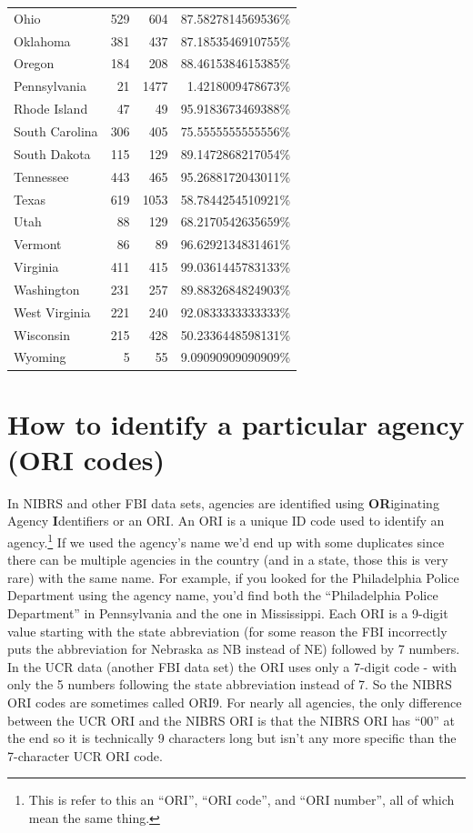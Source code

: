 \documentclass[
  12pt,
  openany]{book}
\begin{document}
\begin{longtable}[]{@{}lrrr@{}}
Ohio & 529 & 604 & 87.5827814569536\%\tabularnewline
Oklahoma & 381 & 437 & 87.1853546910755\%\tabularnewline
Oregon & 184 & 208 & 88.4615384615385\%\tabularnewline
Pennsylvania & 21 & 1477 & 1.4218009478673\%\tabularnewline
Rhode Island & 47 & 49 & 95.9183673469388\%\tabularnewline
South Carolina & 306 & 405 & 75.5555555555556\%\tabularnewline
South Dakota & 115 & 129 & 89.1472868217054\%\tabularnewline
Tennessee & 443 & 465 & 95.2688172043011\%\tabularnewline
Texas & 619 & 1053 & 58.7844254510921\%\tabularnewline
Utah & 88 & 129 & 68.2170542635659\%\tabularnewline
Vermont & 86 & 89 & 96.6292134831461\%\tabularnewline
Virginia & 411 & 415 & 99.0361445783133\%\tabularnewline
Washington & 231 & 257 & 89.8832684824903\%\tabularnewline
West Virginia & 221 & 240 & 92.0833333333333\%\tabularnewline
Wisconsin & 215 & 428 & 50.2336448598131\%\tabularnewline
Wyoming & 5 & 55 & 9.09090909090909\%\tabularnewline
\bottomrule
\end{longtable}

\hypertarget{ori}{%
\section{How to identify a particular agency (ORI codes)}\label{ori}}

In NIBRS and other FBI data sets, agencies are identified using \textbf{OR}iginating Agency \textbf{I}dentifiers or an ORI. An ORI is a unique ID code used to identify an agency.\footnote{This is refer to this an ``ORI'', ``ORI code'', and ``ORI number'', all of which mean the same thing.} If we used the agency's name we'd end up with some duplicates since there can be multiple agencies in the country (and in a state, those this is very rare) with the same name. For example, if you looked for the Philadelphia Police Department using the agency name, you'd find both the ``Philadelphia Police Department'' in Pennsylvania and the one in Mississippi. Each ORI is a 9-digit value starting with the state abbreviation (for some reason the FBI incorrectly puts the abbreviation for Nebraska as NB instead of NE) followed by 7 numbers. In the UCR data (another FBI data set) the ORI uses only a 7-digit code - with only the 5 numbers following the state abbreviation instead of 7. So the NIBRS ORI codes are sometimes called ORI9. For nearly all agencies, the only difference between the UCR ORI and the NIBRS ORI is that the NIBRS ORI has ``00'' at the end so it is technically 9 characters long but isn't any more specific than the 7-character UCR ORI code.
\end{document}
